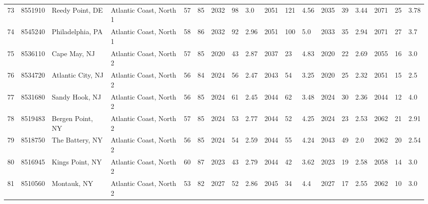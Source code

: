 \begin{longtable}{llllllllllllllllll}
73 &          8551910 &             Reedy Point, DE &  Atlantic Coast, North 1 &              57 &       85 &                      2032 &   98 &    3.0 &     2051 &  121 &   4.56 &                          2035 &  39 &  3.44 &     2071 &   25 &  3.78 \\
74 &          8545240 &            Philadelphia, PA &  Atlantic Coast, North 1 &              58 &       86 &                      2032 &   92 &   2.96 &     2051 &  100 &    5.0 &                          2033 &  35 &  2.94 &     2071 &   27 &   3.7 \\
75 &          8536110 &                Cape May, NJ &  Atlantic Coast, North 2 &              57 &       85 &                      2020 &   43 &   2.87 &     2037 &   23 &   4.83 &                          2020 &  22 &  2.69 &     2055 &   16 &   3.0 \\
76 &          8534720 &           Atlantic City, NJ &  Atlantic Coast, North 2 &              56 &       84 &                      2024 &   56 &   2.47 &     2043 &   54 &   3.25 &                          2020 &  25 &  2.32 &     2051 &   15 &   2.5 \\
77 &          8531680 &              Sandy Hook, NJ &  Atlantic Coast, North 2 &              56 &       85 &                      2024 &   61 &   2.45 &     2044 &   62 &   3.48 &                          2024 &  30 &  2.36 &     2044 &   12 &   4.0 \\
78 &          8519483 &            Bergen Point, NY &  Atlantic Coast, North 2 &              57 &       85 &                      2024 &   53 &   2.77 &     2044 &   52 &   4.25 &                          2024 &  23 &  2.53 &     2062 &   21 &  2.91 \\
79 &          8518750 &             The Battery, NY &  Atlantic Coast, North 2 &              56 &       85 &                      2024 &   54 &   2.59 &     2044 &   55 &   4.24 &                          2043 &  49 &   2.0 &     2062 &   20 &  2.54 \\
80 &          8516945 &             Kings Point, NY &  Atlantic Coast, North 2 &              60 &       87 &                      2023 &   43 &   2.79 &     2044 &   42 &   3.62 &                          2023 &  19 &  2.58 &     2058 &   14 &   3.0 \\
81 &          8510560 &                 Montauk, NY &  Atlantic Coast, North 2 &              53 &       82 &                      2027 &   52 &   2.86 &     2045 &   34 &    4.4 &                          2027 &  17 &  2.55 &     2062 &   10 &   3.0 \\

\end{longtable}
